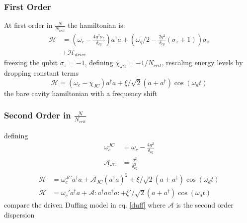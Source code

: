 \subsubsection{First Order}
At first order in $\frac{N}{N_{crit}}$ the hamiltonian is:
\begin{align}
  \mathscr{H} &= (\omega_c
    - \frac{4g^2\sigma_z}{\delta_{cq}}) a ^ \dagger a
    + (\omega_q/2 - \frac{2g^2}{\delta_{cq}} (\sigma_z + 1))\sigma_z\nonumber\\
    &+ \mathscr{H}_{drive}
\end{align}
freezing the qubit $\sigma_z=-1$,
defining $\chi_{JC} = -1/N_{crit}$,
rescaling energy levels by dropping constant terms
\begin{equation}
    \mathscr{H} = \left(\omega_c-\chi_{JC}\right) a ^ \dagger a
    + \xi/\sqrt{2} ( a + a^\dagger ) \cos(\omega_d t)
\end{equation}
the bare cavity hamiltonian with a frequency shift

\subsubsection{Second Order in $\frac{N}{N_{crit}}$}
defining
\begin{align}
    \omega_c^{JC} &= \omega_c - \frac{4g^2}{\delta_{cq}}\\
    \mathscr{A}_{JC} &= \frac{g^2}{\delta_{cq}^3}
\end{align}
\begin{align}
    \mathscr{H} &= \omega_c^{JC} a ^ \dagger a
    + \mathscr{A}_{JC}\left(a^\dagger a\right)^2
    + \xi/\sqrt{2} ( a + a^\dagger ) \cos(\omega_d t)\\
    \mathscr{H} &= \omega_c' a^\dagger a
    + \mathscr{A} : a ^ \dagger a a ^ \dagger a :
    + \xi'/\sqrt{2}(a+a^\dagger)\cos(\omega_d t)\label{duff}
\end{align}
compare the driven Duffing model in eq. \ref{duff}
where $\mathscr{A}$ is the second order dispersion\cite{Drummond1979}
